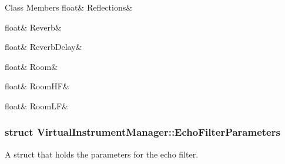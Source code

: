 \begin{DoxyFields}{Class Members}
\mbox{\label{group___virtual_instrument_manager_a6a97ac76aa1503956201878b0517bab7}} 
float&
Reflections&
\\
\hline

\mbox{\label{group___virtual_instrument_manager_a4db1acfd33ea8f9ab20e936d6cd0c6af}} 
float&
Reverb&
\\
\hline

\mbox{\label{group___virtual_instrument_manager_a64f9dcc29c7c75651feb2d10b8494c41}} 
float&
ReverbDelay&
\\
\hline

\mbox{\label{group___virtual_instrument_manager_aa95fd8e568f09b14452030ada4e3e6b5}} 
float&
Room&
\\
\hline

\mbox{\label{group___virtual_instrument_manager_aa1313c71d899da694ed67ef322a817e4}} 
float&
RoomHF&
\\
\hline

\mbox{\label{group___virtual_instrument_manager_a34e15a2268f1d64e57898c553e47fdfe}} 
float&
RoomLF&
\\
\hline

\end{DoxyFields}
\label{struct_virtual_instrument_manager_1_1_echo_filter_parameters}
\subsubsection{struct Virtual\+Instrument\+Manager\+:\+:Echo\+Filter\+Parameters}
A struct that holds the parameters for the echo filter. 

